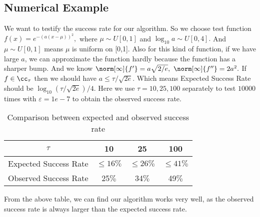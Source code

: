 \subsection{Numerical Example}

We want to testify the success rate for our algorithm. So we
choose test function $f(x)=e^{-(a(x-\mu))^2},$
where $\mu \sim U[0,1]$ and $\log_{10} a \sim U[0,4].$
And $\mu \sim U[0,1]$ means $\mu$ is uniform on [0,1].
Also for this kind of function, if we have large $a$, we can approximate the function hardly
because the function has a sharper bump. And we know
$\norm[\infty]{f'}=a\sqrt{2/e}, \ \norm[\infty]{f''}=2a^2.$
If $f \in \cc_{\tau}$ then we should have
$a \leq \tau/\sqrt{2e}.$ Which means Expected Success Rate should be $\log_{10}(\tau/\sqrt{2e})/4.$
Here we use $\tau = 10, 25 , 100$ separately to test $10000$ times with
$\varepsilon = 1e-7$ to obtain the observed success rate.
\begin{table}[h]
\centering
\begin{tabular}{cccc}
$\tau$ &  10 & 25 & 100\\
\toprule
Expected Success Rate &  $\leq 16 \%$ &  $\leq 26 \%$  & $\leq 41 \%$ \\
Observed Success Rate & 25$\%$ &  34$\%$  & 49$\%$ \\
\end{tabular}
\caption{ Comparison between expected and observed success rate}
\end{table}

From the above table, we can find our algorithm works very well, as the observed
success rate is always larger than the expected success rate.\\




